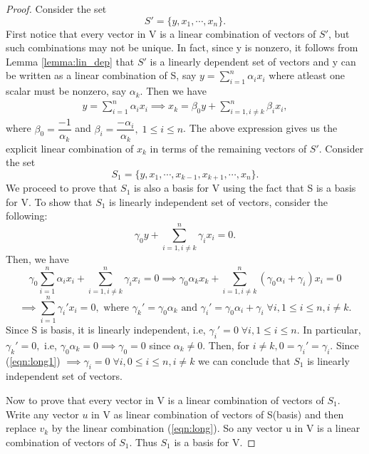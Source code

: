 \documentclass[10pt,a4paper]{article}
\begin{document}
\begin{proof}
    Consider the set 
    $$
        S' = \{y,x_1,\cdots,x_n\}.
    $$
    First notice that every vector in V is a linear combination of vectors of $S'$, but such combinations may not be unique. In fact, since y is nonzero, it follows from Lemma \ref{lemma:lin_dep} that $S'$ is a linearly dependent set of vectors and y can be written as a linear combination of S, say $y=\sum_{i=1}^n\alpha_ix_i$ where atleast one scalar must be nonzero, say $\alpha_k$. Then we have
    \begin{eqnarray}\label{eqn:long}
        y = \sum_{i=1}^n\alpha_ix_i \implies 
        x_k = \beta_0y+\sum_{i=1,i\neq k}^n\beta_ix_i,
    \end{eqnarray}
    where $\beta_0 = \dfrac{-1}{\alpha_k}$ and $\beta_i = \dfrac{-\alpha_i}{\alpha_k},\;1\le i\le n$. The above expression gives us the explicit linear combination of $x_k$ in terms of the remaining vectors of $S'$. Consider the set
    $$
        S_1 = \{y,x_1,\cdots,x_{k-1},x_{k+1},\cdots,x_n\}.
    $$
    We proceed to prove that $S_1$ is also a basis for V using the fact that S is a basis for V. To show that $S_1$ is linearly independent set of vectors, consider the following:
    \begin{equation}\label{eqn:long1}
        \gamma_0y+\sum_{i=1,i\neq k}^n\gamma_ix_i = 0.
    \end{equation}
    Then, we have
    $$
        \gamma_0\sum_{i=1}^n\alpha_ix_i+\sum_{i=1,i\neq k}^n\gamma_ix_i = 0 
        \implies \gamma_0\alpha_kx_k+\sum_{i=1,i\neq k}^n(\gamma_0\alpha_i+\gamma_i)x_i = 0 
    $$
    $$  
        \implies\sum_{i=1}^n\gamma_i' x_i = 0,\text{ where }\gamma_k' = \gamma_0\alpha_k\text{ and }\gamma_i' = \gamma_0\alpha_i+\gamma_i\;\forall i,1\le i\le n,i\neq k.
    $$
    Since S is basis, it is linearly independent, i.e, $\gamma_i' = 0\;\forall i,1\le i\le n$. In particular, $\gamma_k' = 0,$ i.e, $\gamma_0\alpha_k=0\implies \gamma_0=0$ since $\alpha_k\neq 0$. Then, for $i\neq k,0 = \gamma_i' = \gamma_i$. Since (\ref{eqn:long1}) $\implies\gamma_i=0\;\forall i,0\le i\le n,i\neq k$ we can conclude that $S_1$ is linearly independent set of vectors.

    Now to prove that every vector in V is a linear combination of vectors of $S_1$. Write any vector $u$ in V as linear combination of vectors of S(basis) and then replace $v_k$ by the linear combination (\ref{eqn:long}). So any vector u in V is a linear combination of vectors of $S_1$. Thus $S_1$ is a basis for V.
\end{proof}
\end{document}
